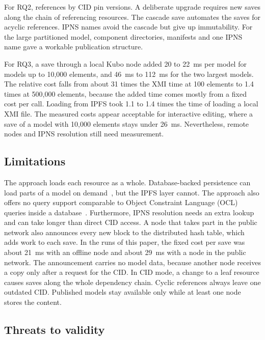 \documentclass[iicol,pdflatex,sn-mathphys-num]{sn-jnl}
\theoremstyle{thmstylethree}%
\begin{document}
For RQ2, references by CID pin versions. A deliberate upgrade requires new saves along the chain of referencing resources. The cascade save automates the saves for acyclic references. IPNS names avoid the cascade but give up immutability. For the large partitioned model, component directories, manifests and one IPNS name gave a workable publication structure.

For RQ3, a save through a local Kubo node added 20 to 22~ms per model for models up to 10,000 elements, and 46~ms to 112~ms for the two largest models. The relative cost falls from about 31 times the XMI time at 100 elements to 1.4 times at 500,000 elements, because the added time comes mostly from a fixed cost per call. Loading from IPFS took 1.1 to 1.4 times the time of loading a local XMI file. The measured costs appear acceptable for interactive editing, where a save of a model with 10,000 elements stays under 26~ms. Nevertheless, remote nodes and IPNS resolution still need measurement.

\subsection{Limitations}\label{sec:limitations}

The approach loads each resource as a whole. Database-backed persistence can load parts of a model on demand~\cite{pagan2011morsa,daniel2017neoemf}, but the IPFS layer cannot. The approach also offers no query support comparable to Object Constraint Language (OCL) queries inside a database~\cite{omg2014ocl,daniel2016mogwai}. Furthermore, IPNS resolution needs an extra lookup and can take longer than direct CID access. A node that takes part in the public network also announces every new block to the distributed hash table, which adds work to each save. In the runs of this paper, the fixed cost per save was about 21~ms with an offline node and about 29~ms with a node in the public network. The announcement carries no model data, because another node receives a copy only after a request for the CID. In CID mode, a change to a leaf resource causes saves along the whole dependency chain. Cyclic references always leave one outdated CID. Published models stay available only while at least one node stores the content.

\subsection{Threats to validity}\label{sec:threats}
\end{document}
